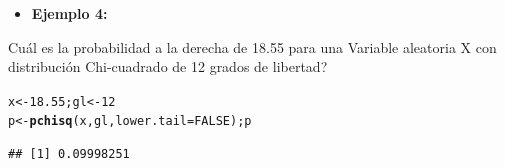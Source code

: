 \documentclass[12pt,letterpaper]{article}\usepackage[]{graphicx}\usepackage[]{color}
\makeatletter
\newcommand{\hlnum}[1]{\textcolor[rgb]{0.686,0.059,0.569}{#1}}%
\newcommand{\hlstd}[1]{\textcolor[rgb]{0.345,0.345,0.345}{#1}}%
\newcommand{\hlkwb}[1]{\textcolor[rgb]{0.69,0.353,0.396}{#1}}%
\newcommand{\hlkwc}[1]{\textcolor[rgb]{0.333,0.667,0.333}{#1}}%
\newcommand{\hlkwd}[1]{\textcolor[rgb]{0.737,0.353,0.396}{\textbf{#1}}}%
\newenvironment{kframe}{%
 \def\at@end@of@kframe{}%
 \ifinner\ifhmode%
  \def\at@end@of@kframe{\end{minipage}}%
  \begin{minipage}{\columnwidth}%
 \fi\fi%
 \def\FrameCommand##1{\hskip\@totalleftmargin \hskip-\fboxsep
 \colorbox{shadecolor}{##1}\hskip-\fboxsep
     \hskip-\linewidth \hskip-\@totalleftmargin \hskip\columnwidth}%
 \MakeFramed {\advance\hsize-\width
   \@totalleftmargin\z@ \linewidth\hsize
   \@setminipage}}%
 {\par\unskip\endMakeFramed%
 \at@end@of@kframe}
\newenvironment{knitrout}{}{} %
\makeatother
\begin{document}
\begin{itemize}
  \item \textbf{Ejemplo 4:}
\end{itemize}
\¿Cu\'al es la probabilidad a la derecha de 18.55 para una Variable aleatoria X con 
distribuci\'on Chi-cuadrado de 12 grados de libertad?
\begin{knitrout}
\color{fgcolor}\begin{kframe}
\begin{alltt}
\hlstd{x} \hlkwb{<-} \hlnum{18.55}\hlstd{; gl} \hlkwb{<-} \hlnum{12}
\hlstd{p} \hlkwb{<-} \hlkwd{pchisq}\hlstd{(x, gl,} \hlkwc{lower.tail} \hlstd{=} \hlnum{FALSE}\hlstd{); p}
\end{alltt}
\begin{verbatim}
## [1] 0.09998251
\end{verbatim}
\end{kframe}
\end{knitrout}
\end{document}
